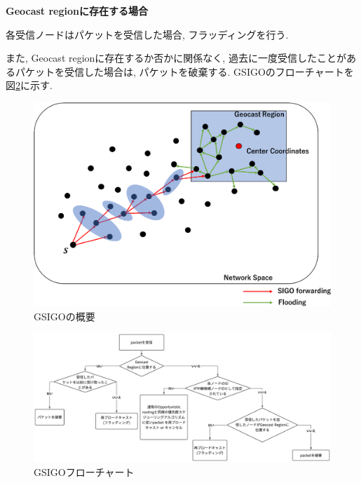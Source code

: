 \documentclass[10pt]{jreport}
\begin{document}
\par
\vspace{5mm}
\noindent
\textbf{Geocast regionに存在する場合}
\vspace{5mm}

各受信ノードはパケットを受信した場合, フラッディングを行う. 

\par
また, Geocast regionに存在するか否かに関係なく, 過去に一度受信したことがあるパケットを受信した場合は, パケットを破棄する.
GSIGOのフローチャートを図\ref{fig:Geocast_flowchart}に示す.



\begin{figure}[!ht]
	\centering
	\includegraphics[width=130mm]{figures/Geocast.eps}
	\caption{GSIGOの概要}
	\label{fig:Geocast}
\end{figure}

\begin{figure}[!ht]
	\centering
	\includegraphics[width=150mm]{figures/Geocast_flowchart.eps}
	\caption{GSIGOフローチャート}
	\label{fig:Geocast_flowchart}
\end{figure}
\end{document}

